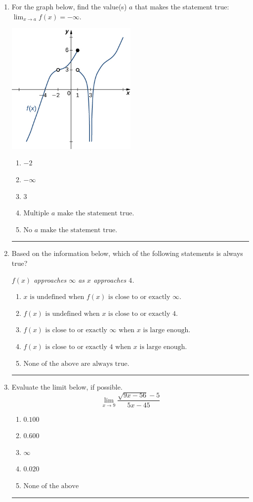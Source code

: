 \documentclass[14pt]{extbook}
\newcommand{\litem}[1]{\item#1\hspace*{-1cm}\rule{\textwidth}{0.4pt}}
\begin{document}
\begin{enumerate}
{\begin{enumerate}[label=\Alph*.]
\end{enumerate} }
\litem{
For the graph below, find the value(s) $a$ that makes the statement true: $ \displaystyle \lim_{x \rightarrow a} f(x) = -\infty$.
\begin{center}
    \includegraphics[width=0.5\textwidth]{../Figures/evaluateLimitGraphicallyCopyA.png}
\end{center}
\begin{enumerate}[label=\Alph*.]
\item \( -2 \)
\item \( -\infty \)
\item \( 3 \)
\item \( \text{Multiple } a \text{ make the statement true}. \)
\item \( \text{No } a \text{ make the statement true}. \)

\end{enumerate} }
\litem{
Based on the information below, which of the following statements is always true?
\begin{center}
    \textit{ $f(x)$ approaches $\infty$ as $x$ approaches $4$. }
\end{center}
\begin{enumerate}[label=\Alph*.]
\item \( x \text{ is undefined when } f(x) \text{ is close to or exactly } \infty. \)
\item \( f(x) \text{ is undefined when } x \text{ is close to or exactly } 4. \)
\item \( f(x) \text{ is close to or exactly } \infty \text{ when } x \text{ is large enough}. \)
\item \( f(x) \text{ is close to or exactly } 4 \text{ when } x \text{ is large enough}. \)
\item \( \text{None of the above are always true.} \)

\end{enumerate} }
\litem{
Evaluate the limit below, if possible.\[ \lim_{x \rightarrow 9} \frac{\sqrt{9x - 56} - 5}{5x - 45} \]\begin{enumerate}[label=\Alph*.]
\item \( 0.100 \)
\item \( 0.600 \)
\item \( \infty \)
\item \( 0.020 \)
\item \( \text{None of the above} \)


\end{enumerate}}
\end{enumerate}
\end{document}
